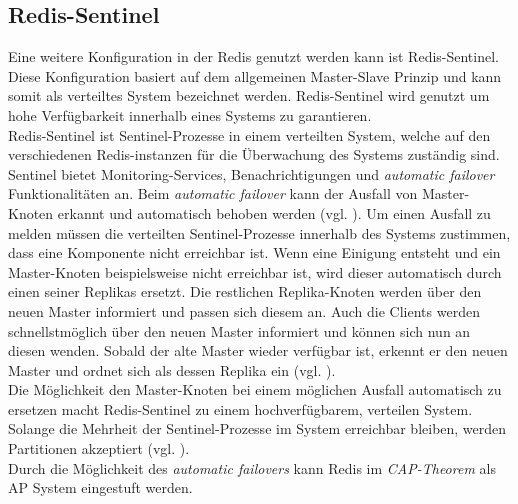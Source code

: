 \subsection{Redis-Sentinel}
Eine weitere Konfiguration in der \acs{Redis} genutzt werden kann ist Redis-Sentinel. Diese Konfiguration basiert auf dem allgemeinen Master-Slave Prinzip und kann somit als verteiltes System bezeichnet werden. Redis-Sentinel wird genutzt um hohe Verfügbarkeit innerhalb eines Systems zu garantieren. 
\\
Redis-Sentinel ist Sentinel-Prozesse in einem verteilten System, welche auf den verschiedenen Redis-instanzen für die Überwachung des Systems zuständig sind. 
\\
Sentinel bietet Monitoring-Services, Benachrichtigungen und \textit{automatic failover} Funktionalitäten an. Beim \textit{automatic failover} kann der Ausfall von Master-Knoten erkannt und automatisch behoben werden (vgl. \cite{Redis-Sentinal}).
Um einen Ausfall zu melden müssen die verteilten Sentinel-Prozesse innerhalb des Systems zustimmen, dass eine Komponente nicht erreichbar ist. Wenn eine Einigung entsteht und ein Master-Knoten beispielsweise nicht erreichbar ist, wird dieser automatisch durch einen seiner Replikas ersetzt.  Die restlichen Replika-Knoten werden über den neuen Master informiert und passen sich diesem an. Auch die Clients werden schnellstmöglich über den neuen Master informiert und können sich nun an diesen wenden. Sobald der alte Master wieder verfügbar ist, erkennt er den neuen Master und ordnet sich als dessen Replika ein (vgl. \cite{Redis-Sentinal}).
\\
Die Möglichkeit den Master-Knoten bei einem möglichen Ausfall automatisch zu ersetzen macht Redis-Sentinel zu einem hochverfügbarem, verteilen System.
\\
Solange die Mehrheit der Sentinel-Prozesse im System erreichbar bleiben, werden Partitionen akzeptiert (vgl. \cite{Redis-Sentinal}).
\\
Durch die Möglichkeit des \textit{automatic failovers} kann Redis im \textit{CAP-Theorem} als AP System eingestuft werden.